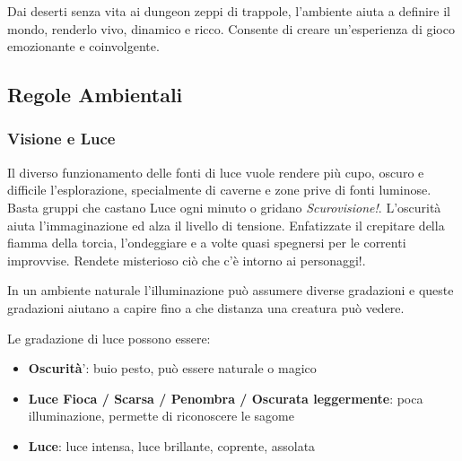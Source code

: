 \begin{multicols}{2}

Dai deserti senza vita ai dungeon zeppi di trappole, l'ambiente aiuta a definire il mondo, renderlo vivo, dinamico e ricco. Consente di creare un'esperienza di gioco emozionante e coinvolgente.

\subsection{Regole Ambientali}

\label{regole-ambientali}

\subsubsection{Visione e Luce}\hypertarget{visioneeluce}{}\label{visioneeluce}


\begin{changemargin}{0.3cm}{0.3cm}\begin{narratore}
Il diverso funzionamento delle fonti di luce vuole rendere più cupo, oscuro e difficile l'esplorazione, specialmente di caverne e zone prive di fonti luminose. Basta gruppi che castano Luce ogni minuto o gridano \emph{Scurovisione!}. L'oscurità aiuta l'immaginazione ed alza il livello di tensione. Enfatizzate il crepitare della fiamma della torcia, l'ondeggiare e a volte quasi spegnersi per le correnti improvvise. Rendete misterioso ciò che c'è intorno ai personaggi!.
\end{narratore}\end{changemargin}

\label{sec:visione-e-luce}

In un ambiente naturale l'illuminazione può assumere diverse gradazioni e queste gradazioni aiutano a capire fino a che distanza una creatura può vedere.

Le gradazione di luce possono essere:
\begin{itemize}[leftmargin=*] \setlength{\itemsep}{0pt}
\item
\textbf{Oscurità}': buio pesto, può essere naturale o magico
\item
\textbf{Luce Fioca / Scarsa / Penombra / Oscurata leggermente}: poca illuminazione, permette di riconoscere le sagome
\item
\textbf{Luce}: luce intensa, luce brillante, coprente, assolata
\end{itemize}


\end{multicols}
